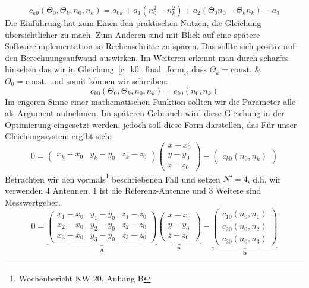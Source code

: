 \begin{equation}
c_{k0}(\Theta_0, \Theta_k, n_0, n_k) = a_{0k}+a_1(n_0^2-n_k^2)+a_2(\Theta_0n_0-\Theta_kn_k)-a_3\label{c_k0_final_form}   
\end{equation}
%
Die Einführung hat zum Einen den praktischen Nutzen, die Gleichung übersichtlicher zu mach. Zum Anderen sind mit Blick auf eine spätere Softwareimplementation so Rechenschritte zu sparen. Das sollte sich positiv auf den Berechnungsaufwand auswirken.
%
Im Weiteren erkennt man durch scharfes hinsehen das wir in Gleichung~\eqref{c_k0_final_form}, dass $\Theta_k=\text{const.}$ \& $\Theta_0=\text{const.}$ und somit können wir schreiben:
\begin{equation}
c_{k0}(\Theta_0, \Theta_k, n_0, n_k) = c_{k0}(n_0, n_k)
\end{equation}
%
Im engeren Sinne einer mathematischen Funktion sollten wir die Parameter alle als Argument aufnehmen. Im späteren Gebrauch wird diese Gleichung in der Optimierung eingesetzt werden. jedoch soll diese Form darstellen, das
Für unser Gleichungssystem ergibt sich:
\begin{equation}\label{eq:wavenumber_trilateration_model}
0=
\left(
	\begin{array}{ccc}
		x_k-x_0 & y_k-y_0 & z_k-z_0 
	\end{array}
\right)
\left(
   \begin{array}{c}
	   x-x_0\\
	   y-y_0\\
	   z-z_0
   \end{array}
\right)
-
\left(
	\begin{array}{c}
		c_{k0}(n_0, n_k)
	\end{array}
\right)
\end{equation}
%
Betrachten wir den vormals\footnote{Wochenbericht KW 20, Anhang B} beschriebenen Fall und setzen $N'=4$, d.h. wir verwenden 4 Antennen. 1 ist die Referenz-Antenne und 3 Weitere sind Messwertgeber.
%
\begin{equation}\label{eq:wavenumber_trilateration_model_explicit}
0=
\underbrace{\left(
	\begin{array}{ccc}
		x_1-x_0 & y_1-y_0 & z_1-z_0 \\
		x_2-x_0 & y_2-y_0 & z_2-z_0 \\
		x_3-x_0 & y_3-y_0 & z_3-z_0 
	\end{array}
\right)}_{\textbf{A}}
\underbrace{\left(
   \begin{array}{c}
	   x-x_0\\
	   y-y_0\\
	   z-z_0
   \end{array}
\right)}_{\textbf{x}}
-
\underbrace{\left(
	\begin{array}{c}
		c_{10}(n_0, n_1) \\
		c_{20}(n_0, n_2) \\
		c_{30}(n_0, n_3)
	\end{array}
\right)}_{\textbf{b}}
\end{equation}
